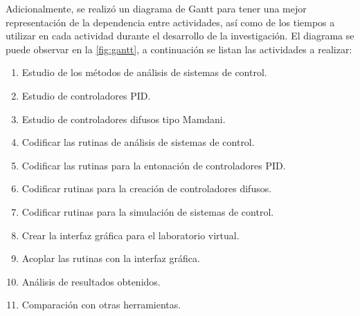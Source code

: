 		Adicionalmente, se realizó un diagrama de Gantt para tener una mejor representación de la dependencia entre actividades, así como de los tiempos a utilizar en cada actividad durante el desarrollo de la investigación. El diagrama se puede observar en la \cref{fig:gantt}, a continuación se listan las actividades a realizar:

		\vspace{10pt}

		\begin{enumerate}[label=\bfseries Actividad \arabic*:, wide=0pt, leftmargin=*]
			\item Estudio de los métodos de análisis de sistemas de control. 
			\item Estudio de controladores PID.
			\item Estudio de controladores difusos tipo Mamdani.
			\item Codificar las rutinas de análisis de sistemas de control.
			\item Codificar las rutinas para la entonación de controladores PID.
			\item Codificar rutinas para la creación de controladores difusos.
			\item Codificar rutinas para la simulación de sistemas de control.
			\item Crear la interfaz gráfica para el laboratorio virtual.
			\item Acoplar las rutinas con la interfaz gráfica.
			\item Análisis de resultados obtenidos.
			\item Comparación con otras herramientas.
		\end{enumerate}

